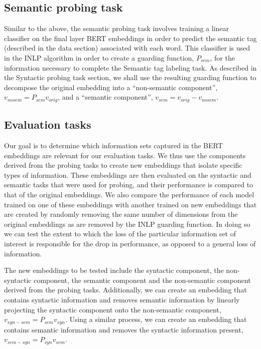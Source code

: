 \documentclass[11pt,a4paper]{article}
\begin{document}
\subsection{Semantic probing task}
\label{sec:semantics}

Similar to the above, the semantic probing task involves training a linear classifier on the final layer BERT embeddings in order to predict the semantic tag (described in the data section) associated with each word. This classifier is used in the INLP algorithm in order to create a guarding function, $P_{sem}$, for the information necessary to complete the Semantic tag labeling task. As described in the Syntactic probing task section, we shall use the resulting guarding function to decompose the original embedding into a ``non-semantic component'', $v_{no sem} = P_{sem} v_{orig}$, and a ``semantic component'', $v_{sem} = v_{orig} - v_{no sem}$. 


\subsection{Evaluation tasks}
\label{sec:eval}

Our goal is to determine which information sets captured in the BERT embeddings are relevant for our evaluation tasks. We thus use the components derived from the probing tasks to create new embeddings that isolate specific types of information. These embeddings are then evaluated on the syntactic and semantic tasks that were used for probing, and their performance is compared to that of the original embeddings. We also compare the performance of each model trained on one of these embeddings with another trained on new embeddings that are created by randomly removing the same number of dimensions from the original embeddings as are removed by the INLP guarding function. In doing so we can test the extent to which the loss of the particular information set of interest is responsible for the drop in performance, as opposed to a general loss of information. 

The new embeddings to be tested include the syntactic component, the non-syntactic component, the semantic component and the non-semantic component derived from the probing tasks. Additionally, we can create an embedding that contains syntactic information and removes semantic information by linearly projecting the syntactic component onto the non-semantic component, $v_{syn - sem} = P_{sem} v_{syn}$. Using a similar process, we can create an embedding that contains semantic information and removes the syntactic information present, $v_{sem - syn} = P_{syn} v_{sem}$. 
\end{document}
